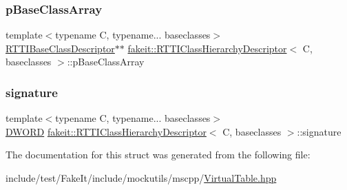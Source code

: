 \subsubsection{\texorpdfstring{pBaseClassArray}{pBaseClassArray}}
{\footnotesize\ttfamily template$<$typename C, typename... baseclasses$>$ \\
\mbox{\hyperlink{structfakeit_1_1RTTIBaseClassDescriptor}{R\+T\+T\+I\+Base\+Class\+Descriptor}}$\ast$$\ast$ \mbox{\hyperlink{structfakeit_1_1RTTIClassHierarchyDescriptor}{fakeit\+::\+R\+T\+T\+I\+Class\+Hierarchy\+Descriptor}}$<$ C, baseclasses $>$\+::p\+Base\+Class\+Array}

\mbox{\label{structfakeit_1_1RTTIClassHierarchyDescriptor_a27bf017cf881b756eff21720d1f5e4f7}} 
\subsubsection{\texorpdfstring{signature}{signature}}
{\footnotesize\ttfamily template$<$typename C, typename... baseclasses$>$ \\
\mbox{\hyperlink{namespacefakeit_a3d9fcff73186d3a22472ec6156db1f10}{D\+W\+O\+RD}} \mbox{\hyperlink{structfakeit_1_1RTTIClassHierarchyDescriptor}{fakeit\+::\+R\+T\+T\+I\+Class\+Hierarchy\+Descriptor}}$<$ C, baseclasses $>$\+::signature}



The documentation for this struct was generated from the following file\+:\begin{DoxyCompactItemize}
\item 
include/test/\+Fake\+It/include/mockutils/mscpp/\mbox{\hyperlink{mscpp_2VirtualTable_8hpp}{Virtual\+Table.\+hpp}}\end{DoxyCompactItemize}
